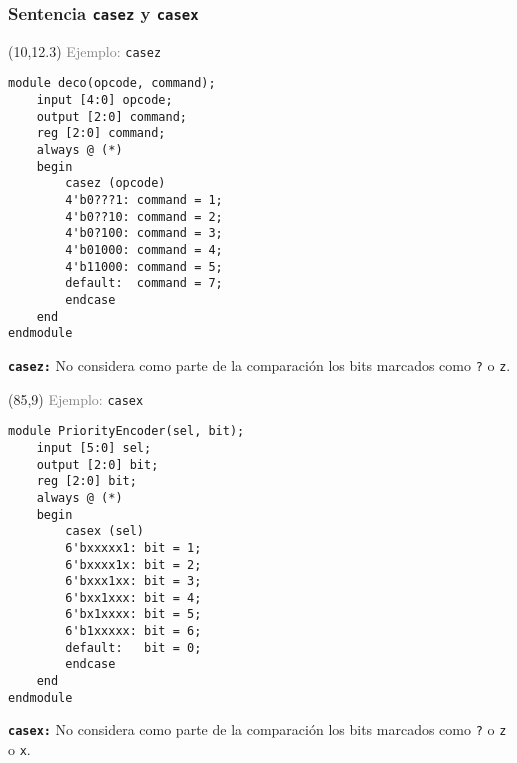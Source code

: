 \documentclass[aspectratio=169]{beamer}
\begin{document}
\begin{frame}[fragile,t]
    \frametitle{Sentencia \texttt{casez} y \texttt{casex}}
    \begin{textblock}{64}(10,12.3)
    \textcolor{gray}{Ejemplo:} \texttt{casez}\\
\lstset{basicstyle=\scriptsize}
\begin{lstlisting}
module deco(opcode, command);
    input [4:0] opcode;
    output [2:0] command;
    reg [2:0] command;
    always @ (*)
    begin
        casez (opcode)
        4'b0???1: command = 1;
        4'b0??10: command = 2;
        4'b0?100: command = 3;
        4'b01000: command = 4;
        4'b11000: command = 5;
        default:  command = 7;
        endcase
    end
endmodule
\end{lstlisting}
    \small
    \textcolor{naranjauca}{\texttt{\textbf{casez:}}} No considera como parte de la comparación los bits marcados como \texttt{?} o \texttt{z}.
    \end{textblock}
    \begin{textblock}{64}(85,9)
    \textcolor{gray}{Ejemplo:} \texttt{casex}\\
\lstset{basicstyle=\scriptsize}
\begin{lstlisting}
module PriorityEncoder(sel, bit);
    input [5:0] sel;
    output [2:0] bit;
    reg [2:0] bit;
    always @ (*)
    begin
        casex (sel)
        6'bxxxxx1: bit = 1;
        6'bxxxx1x: bit = 2;
        6'bxxx1xx: bit = 3;
        6'bxx1xxx: bit = 4;
        6'bx1xxxx: bit = 5;
        6'b1xxxxx: bit = 6;
        default:   bit = 0;
        endcase
    end
endmodule
\end{lstlisting}
    \small
    \textcolor{naranjauca}{\texttt{\textbf{casex:}}} No considera como parte de la comparación los bits marcados como \texttt{?} o \texttt{z} o \texttt{x}.
    \end{textblock}
\end{frame}
\end{document}
